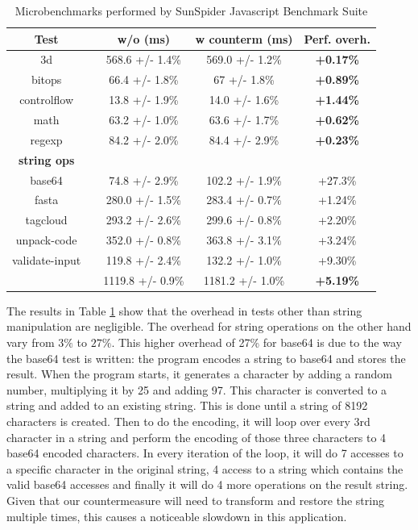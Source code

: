 \begin{table}[htdp] 
\begin{center}
\begin{tabular}{|cl|c|c|c|}
\hline
\bf{Test} 		& & \bf{w/o (ms)} 			& \bf{w counterm (ms)}  		& \bf{Perf. overh.} \\
\hline
3d &                 	&                568.6 +/- 1.4\%  	&   569.0 +/- 1.2\%    	&   \bf{+0.17\%}\\
\hline
bitops &         		&          66.4 +/- 1.8\%   	&  67 +/- 1.8\%    	&\bf{+0.89\%}  \\
\hline
controlflow  &   &     13.8 +/- 1.9\% 	&    14.0 +/- 1.6\% 	&	\bf{+1.44\%} \\
\hline
math &         	&      	 63.2 +/- 1.0\%    	& 	63.6 +/- 1.7\%  	&\bf{+0.62\%}\\
\hline
 regexp &         &        84.2 +/- 2.0\% &    84.4 +/- 2.9\%  &   \bf{+0.23\%} \\
\hline
\bf{string ops} &&& & \\
    base64   	&  &          74.8 +/- 2.9\%		&  102.2 +/- 1.9\%  		&  	+27.3\%\\
    fasta      	&   &      280.0 +/- 1.5\%   	& 283.4 +/- 0.7\%  	  	&	+1.24\%\\
    tagcloud     &	&     	 293.2 +/- 2.6\%   		&  299.6 +/- 0.8\%  		& 	+2.20\%\\
    unpack-code  & &    352.0 +/- 0.8\%   		&  363.8 +/- 3.1\%  		& 	+3.24\%\\
    validate-input  & &   119.8 +/- 2.4\%  		&   132.2 +/- 1.0\% 		&  	 +9.30\%\\
\hline
&      		&         1119.8 +/- 0.9\%  		&  1181.2 +/- 1.0\%  	& \bf{+5.19\%} \\ 
\hline
\end{tabular}
\end{center}
\caption{{ Microbenchmarks performed by SunSpider Javascript Benchmark Suite}}
\label{sunbench}
\end{table}

The results in Table \ref{sunbench} show that the overhead in tests other than string manipulation are negligible.
The overhead for string operations on the other hand vary from $3\%$  to $27\%$.  This higher overhead of 27\% for base64 is due to the way the base64 test is written: the program encodes a string to base64 and stores the result. When the program starts, it generates a character by adding a random number, multiplying it by 25 and adding 97. This character is converted to a string and added to an existing string. This is done until a string of 8192 characters is created. Then to do the encoding, it will loop over every 3rd character in a string and perform the encoding of those three characters to 4 base64 encoded characters. In every iteration of the loop, it will do 7 accesses to a specific character in the original string, 4 access to a string which contains the valid base64 accesses and finally it will do 4 more operations on the result string. Given that our countermeasure will need to transform and restore the string multiple times, this causes a noticeable slowdown in this application.

